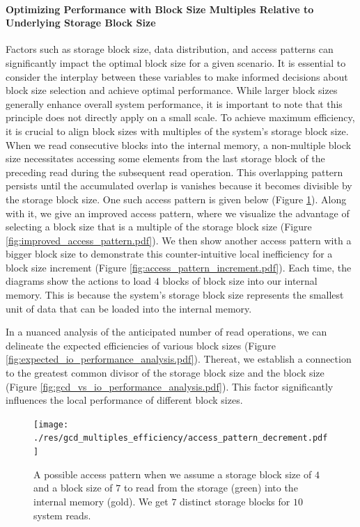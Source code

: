 \documentclass[twocolumn]{article}
\begin{document}
\paragraph*{Optimizing Performance with Block Size Multiples Relative to Underlying Storage Block Size}
\label{par:storage_block_size}
Factors such as storage block size, data distribution, and access patterns can significantly impact the optimal block size for a given scenario.
It is essential to consider the interplay between these variables to make informed decisions about block size selection and achieve optimal performance.
While larger block sizes generally enhance overall system performance, it is important to note that this principle does not directly apply on a small scale.
To achieve maximum efficiency, it is crucial to align block sizes with multiples of the system's storage block size.
When we read consecutive blocks into the internal memory, a non-multiple block size necessitates accessing some elements from the last storage block of the
preceding read during the subsequent read operation.
This overlapping pattern persists until the accumulated overlap is vanishes because it becomes divisible by the storage block size.
One such access pattern is given below (Figure \ref{fig:access_pattern_decrement.pdf}). Along with it, we give an improved access pattern, where we visualize the advantage of selecting
a block size that is a multiple of the storage block size (Figure \ref{fig:improved_access_pattern.pdf}). We then show another access pattern with a bigger block size to demonstrate
this counter-intuitive local inefficiency for a block size increment (Figure \ref{fig:access_pattern_increment.pdf}). Each time, the diagrams show the actions to load \( 4 \) blocks of block size
into our internal memory.
This is because the system's storage block size represents the smallest unit of data that can be loaded into the internal memory.

In a nuanced analysis of the anticipated number of read operations, we can delineate the expected efficiencies of various block sizes (Figure \ref{fig:expected_io_performance_analysis.pdf}).
Thereat, we establish a connection to the greatest common divisor of the storage block size and the block size (Figure \ref{fig:gcd_vs_io_performance_analysis.pdf}).
This factor significantly influences the local performance of different block sizes.

\begin{figure}[htb]
    \begin{minipage}{0.475 \textwidth}
        \centering
        \texttt{[image: ./res/gcd\_multiples\_efficiency/access\_pattern\_decrement.pdf]}
        \caption{A possible access pattern when we assume a storage block size of \( 4 \) and a block size of \( 7 \) to read from the storage (green) into the internal memory (gold).
            We get \( 7 \) distinct storage blocks for \( 10 \) system reads. }
        \label{fig:access_pattern_decrement.pdf}
    \end{minipage}
\end{figure}
\end{document}
